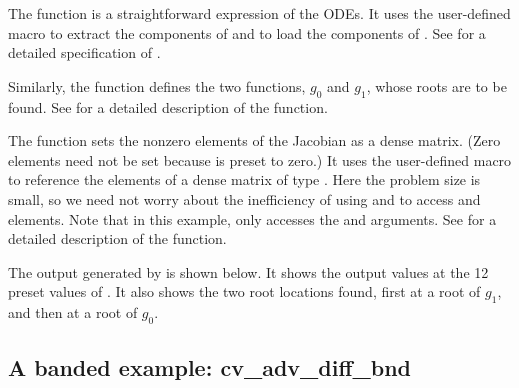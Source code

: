The function  is a straightforward expression of the ODEs. 
It uses the user-defined macro  to extract the components of 
and to load the components of .
See  for a detailed specification of .

Similarly, the function  defines the two functions, $g_0$ and $g_1$,
whose roots are to be found.  See  for a detailed description
of the  function.

The function  sets the nonzero elements of the Jacobian as a
dense matrix.  (Zero elements need not be set because  is preset
to zero.)  It uses the user-defined macro  to reference the
elements of a dense matrix of type {\sunmatrix}.  Here the problem
size is small, so we need not worry about the inefficiency of using
 and  to access  and
{\sunmatdense} elements.  Note that in this example, 
only accesses the  and  arguments.  See 
for a detailed description of the  function.

The output generated by  is shown below.  It shows the output
values at the 12 preset values of .  It also shows the two root
locations found, first at a root of $g_1$, and then at a root of $g_0$.



\subsection{A banded example: cv\_adv\_diff\_bnd}\label{ss:cv_adv_diff}

